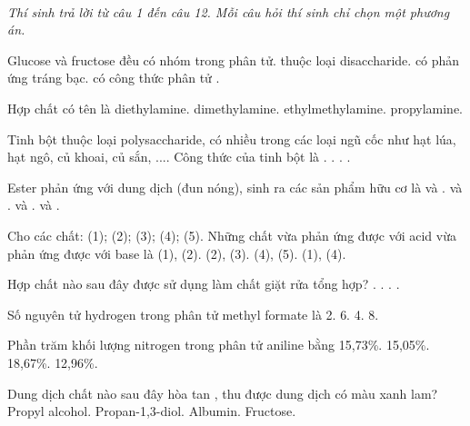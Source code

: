 \documentclass[11pt,a4paper]{article}
\begin{document}
 \\
\textit{Thí sinh trả lời từ câu 1 đến câu 12. Mỗi câu hỏi thí sinh chỉ chọn một phương án.}
\vspace{4pt}
\begin{ex}
Glucose và fructose đều
\choice
{có nhóm  trong phân tử.}
{thuộc loại disaccharide.}
{có phản ứng tráng bạc.}
{có công thức phân tử .}
\loigiai{}
\end{ex}
\begin{ex}
Hợp chất  có tên là
\choice
{diethylamine.}
{dimethylamine.}
{ethylmethylamine.}
{propylamine.}
\loigiai{}
\end{ex}
\begin{ex}
Tinh bột thuộc loại polysaccharide, có nhiều trong các loại ngũ cốc như hạt lúa, hạt ngô, củ khoai, củ sắn, .... Công thức của tinh bột là
\choice
{.}
{.}
{.}
{.}
\loigiai{}
\end{ex}
\begin{ex}
Ester  phản ứng với dung dịch  (đun nóng), sinh ra các sản phẩm hữu cơ là
\choice
{ và .}
{ và .}
{ và .}
{ và .}
\loigiai{}
\end{ex}
\begin{ex}
Cho các chất:  (1);  (2);  (3);  (4);  (5). Những chất vừa phản ứng được với acid vừa phản ứng được với base là
\choice
{(1), (2).}
{(2), (3).}
{(4), (5).}
{(1), (4).}
\loigiai{}
\end{ex}
\begin{ex}
Hợp chất nào sau đây được sử dụng làm chất giặt rửa tổng hợp?
\choice
{.}
{.}
{.}
{.}
\loigiai{}
\end{ex}
\begin{ex}
Số nguyên tử hydrogen trong phân tử methyl formate là
\choice
{2.}
{6.}
{4.}
{8.}
\loigiai{}
\end{ex}
\begin{ex}
Phần trăm khối lượng nitrogen trong phân tử aniline bằng
\choice
{15,73\%.}
{15,05\%.}
{18,67\%.}
{12,96\%.}
\loigiai{}
\end{ex}
\begin{ex}
Dung dịch chất nào sau đây hòa tan , thu được dung dịch có màu xanh lam?
\choice
{Propyl alcohol.}
{Propan-1,3-diol.}
{Albumin.}
{Fructose.}
\loigiai{}
\end{ex}
\end{document}
